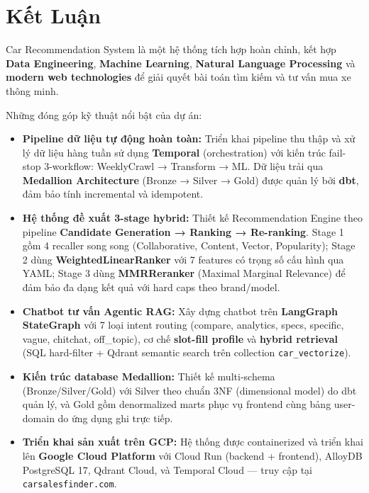 \section{Kết Luận}

Car Recommendation System là một hệ thống tích hợp hoàn chỉnh, kết hợp \textbf{Data Engineering}, \textbf{Machine Learning}, \textbf{Natural Language Processing} và \textbf{modern web technologies} để giải quyết bài toán tìm kiếm và tư vấn mua xe thông minh.

\noindent Những đóng góp kỹ thuật nổi bật của dự án:

\begin{itemize}
    \item \textbf{Pipeline dữ liệu tự động hoàn toàn:} Triển khai pipeline thu thập và xử lý dữ liệu hàng tuần sử dụng \textbf{Temporal} (orchestration) với kiến trúc fail-stop 3-workflow: WeeklyCrawl → Transform → ML. Dữ liệu trải qua \textbf{Medallion Architecture} (Bronze → Silver → Gold) được quản lý bởi \textbf{dbt}, đảm bảo tính incremental và idempotent.

    \item \textbf{Hệ thống đề xuất 3-stage hybrid:} Thiết kế Recommendation Engine theo pipeline \textbf{Candidate Generation → Ranking → Re-ranking}. Stage 1 gồm 4 recaller song song (Collaborative, Content, Vector, Popularity); Stage 2 dùng \textbf{WeightedLinearRanker} với 7 features có trọng số cấu hình qua YAML; Stage 3 dùng \textbf{MMRReranker} (Maximal Marginal Relevance) để đảm bảo đa dạng kết quả với hard caps theo brand/model.

    \item \textbf{Chatbot tư vấn Agentic RAG:} Xây dựng chatbot trên \textbf{LangGraph StateGraph} với 7 loại intent routing (compare, analytics, specs, specific, vague, chitchat, off\_topic), cơ chế \textbf{slot-fill profile} và \textbf{hybrid retrieval} (SQL hard-filter + Qdrant semantic search trên collection \texttt{car\_vectorize}).

    \item \textbf{Kiến trúc database Medallion:} Thiết kế multi-schema (Bronze/Silver/Gold) với Silver theo chuẩn 3NF (dimensional model) do dbt quản lý, và Gold gồm denormalized marts phục vụ frontend cùng bảng user-domain do ứng dụng ghi trực tiếp.

    \item \textbf{Triển khai sản xuất trên GCP:} Hệ thống được containerized và triển khai lên \textbf{Google Cloud Platform} với Cloud Run (backend + frontend), AlloyDB PostgreSQL 17, Qdrant Cloud, và Temporal Cloud — truy cập tại \texttt{carsalesfinder.com}.
\end{itemize}

